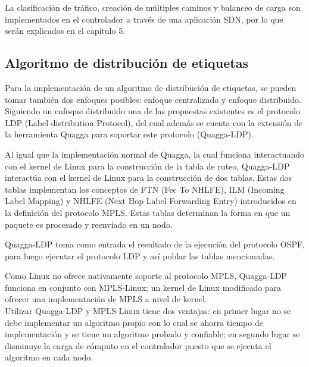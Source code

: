 La clasificaci\'on de tr\'afico, creación de m\'ultiples caminos y balanceo de carga son implementados en el controlador a través de una aplicaci\'on SDN, por lo que ser\'an explicados en el cap\'itulo 5.

\subsection{Algoritmo de distribución de etiquetas}

Para la implementaci\'on de un algoritmo de distribución de etiquetas, se pueden tomar también dos enfoques posibles: enfoque centralizado y enfoque distribuido.\\

Siguiendo un enfoque distribuido una de las propuestas existentes es el protocolo LDP (Label distribution Protocol), del cual adem\'as se cuenta con la extensi\'on de la herramienta Quagga para soportar este protocolo (Quagga-LDP).

Al igual que la implementaci\'on normal de Quagga, la cual funciona interactuando con el kernel de Linux para la construcci\'on de la tabla de ruteo, Quagga-LDP interact\'ua con el kernel de Linux para la construcci\'on de dos tablas. Estas dos tablas implementan los conceptos de FTN (Fec To NHLFE), ILM (Incoming Label Mapping) y NHLFE (Next Hop Label Forwarding Entry) introducidos en la definición del protocolo MPLS.  Estas tablas determinan la forma en que un paquete es procesado y reenviado en un nodo.

Quagga-LDP toma como entrada el resultado de la ejecuci\'on del protocolo OSPF, para luego ejecutar el protocolo LDP y así poblar las tablas mencionadas.

Como Linux no ofrece nativamente soporte al protocolo MPLS, Quagga-LDP funciona en conjunto con MPLS-Linux; un kernel de Linux modificado para ofrecer una implementaci\'on de MPLS a nivel de kernel.\\

Utilizar Quagga-LDP y MPLS-Linux tiene dos ventajas: en primer lugar no se debe implementar un algoritmo propio con lo cual se ahorra tiempo de implementaci\'on y se tiene un algoritmo probado y confiable; en segundo lugar se disminuye la carga de c\'omputo en el controlador puesto que se ejecuta el algoritmo en cada nodo.


